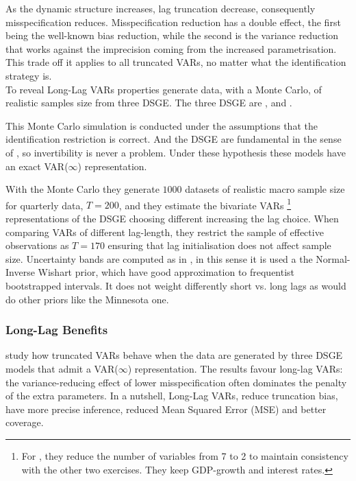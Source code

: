 \documentclass[12pt, a4paper]{article}
\begin{document}
As the dynamic structure increases, lag truncation decrease, consequently misspecification reduces.
Misspecification reduction has a double effect, the first being the well-known bias reduction, while 
the second is the variance reduction that works against the imprecision coming from the increased parametrisation.
This trade off it applies to all truncated VARs, no matter what the identification strategy is.
\\

To reveal Long-Lag VARs properties \citet{Long_Lag2025} generate data, with a Monte Carlo, of realistic samples size 
from three DSGE.
The three DSGE are \citet{ChariKehoeMcGrattan2008}, \citet{CEV2007} and \citet{SW2007}.

This Monte Carlo simulation is conducted under the assumptions that the identification restriction is correct.
And the DSGE are fundamental in the sense of \citet{FVRRSS2007}, so invertibility is never a problem.
Under these hypothesis these models have an exact VAR($\infty$) representation.

With the Monte Carlo they generate $1000$ datasets of realistic macro sample size for quarterly data, $T = 200$,
and they estimate the bivariate VARs \footnote{For \citet{SW2007}, they reduce the number of variables from 7 to 2 
to maintain consistency with the other two exercises. They keep GDP-growth and interest rates.}
representations of the DSGE choosing different increasing the lag choice.
When comparing VARs of different lag-length, they restrict the sample of effective observations as $T = 170$ 
ensuring that lag initialisation does not affect sample size.
Uncertainty bands are computed as in \citep{Sims_Zha1999, Canova2007, Uhlig2005}, in this sense 
it is used a the Normal-Inverse Wishart prior, which have good approximation to frequentist bootstrapped intervals.
It does not weight differently short vs. long lags as would do other priors like the Minnesota one.

\subsubsection*{Long-Lag Benefits}
\label{sec:long-lag_benefits}

\citet{Long_Lag2025} study how truncated VARs behave when the data are generated by three DSGE models that
admit a VAR($\infty$) representation. The results favour long-lag VARs: the variance-reducing effect of lower
misspecification often dominates the penalty of the extra parameters.
In a nutshell, Long-Lag VARs, reduce truncation bias, have more 
precise inference, reduced Mean Squared Error (MSE) and better coverage.
\\
\end{document}
